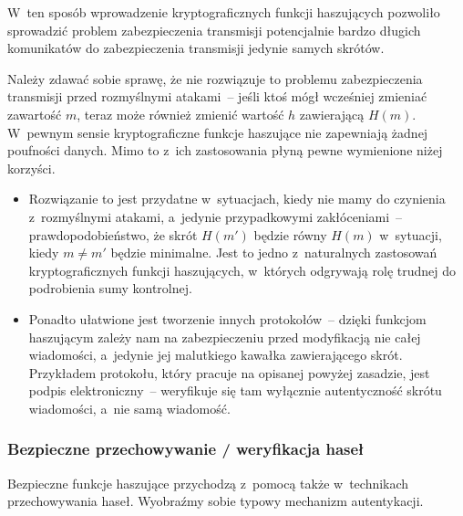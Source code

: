 W~ten sposób wprowadzenie kryptograficznych funkcji haszujących pozwoliło
sprowadzić problem zabezpieczenia transmisji potencjalnie bardzo długich
komunikatów do zabezpieczenia transmisji jedynie samych skrótów.

Należy zdawać sobie sprawę, że nie rozwiązuje to problemu zabezpieczenia
transmisji przed rozmyślnymi atakami~-- jeśli ktoś mógł wcześniej zmieniać
zawartość $m$, teraz może również zmienić wartość $h$ zawierającą $H(m)$.
W~pewnym sensie kryptograficzne funkcje haszujące nie zapewniają żadnej
poufności danych. Mimo to z~ich zastosowania płyną pewne wymienione niżej
korzyści.

\begin{itemize}

    \item Rozwiązanie to jest przydatne w~sytuacjach, kiedy nie mamy do
    czynienia z~rozmyślnymi atakami, a~jedynie przypadkowymi zakłóceniami~--
    prawdopodobieństwo, że skrót $H(m')$ będzie równy $H(m)$ w~sytuacji, kiedy
    $m \neq m'$ będzie minimalne. Jest to jedno z~naturalnych zastosowań
    kryptograficznych funkcji haszujących, w~których odgrywają rolę trudnej do
    podrobienia sumy kontrolnej.

    \item Ponadto ułatwione jest tworzenie innych protokołów~-- dzięki funkcjom
    haszującym zależy nam na zabezpieczeniu przed modyfikacją nie całej
    wiadomości, a~jedynie jej malutkiego kawałka zawierającego skrót.
    Przykładem protokołu, który pracuje na opisanej powyżej zasadzie, jest
    podpis elektroniczny~--  weryfikuje się tam wyłącznie
    autentyczność skrótu wiadomości, a~nie samą wiadomość.

\end{itemize}



\subsubsection{Bezpieczne przechowywanie / weryfikacja haseł}
\label{sec:usage_password_check}%
Bezpieczne funkcje haszujące przychodzą z~pomocą także w~technikach
przechowywania haseł. Wyobraźmy sobie typowy mechanizm autentykacji.

